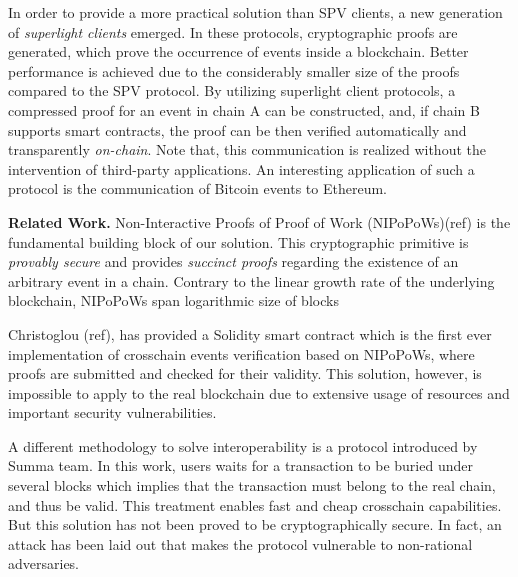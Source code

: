 In order to provide a more practical solution than SPV clients, a new
generation of \emph{superlight clients} emerged. In these protocols,
cryptographic proofs are generated, which prove the occurrence of events inside
a blockchain. Better performance is achieved due to the considerably smaller
size of the proofs compared to the SPV protocol. By utilizing superlight client
protocols, a compressed proof for an event in chain A can be constructed, and,
if chain B supports smart contracts, the proof can be then verified
automatically and transparently \emph{on-chain}. Note that, this communication
is realized without the intervention of third-party applications. An
interesting application of such a protocol is the communication of Bitcoin
events to Ethereum.

\noindent

\textbf{Related Work.} Non-Interactive Proofs of Proof of Work (NIPoPoWs)(ref)
is the fundamental building block of our solution. This cryptographic primitive
is \emph{provably secure} and provides \emph{succinct proofs} regarding the
existence of an arbitrary event in a chain. Contrary to the linear growth rate
of the underlying blockchain, NIPoPoWs span logarithmic size of blocks

Christoglou (ref), has provided a Solidity smart contract which is the first
ever implementation of crosschain events verification based on NIPoPoWs, where
proofs are submitted and checked for their validity. This solution, however, is
impossible to apply to the real blockchain due to extensive usage of resources
and important security vulnerabilities.

A different methodology to solve interoperability is a protocol introduced by
Summa team. In this work, users waits for a transaction to be buried under
several blocks which implies that the transaction must belong to the real
chain, and thus be valid. This treatment enables fast and cheap crosschain
capabilities. But this solution has not been proved to be cryptographically
secure. In fact, an attack has been laid out that makes the protocol vulnerable
to non-rational adversaries.

\noindent

